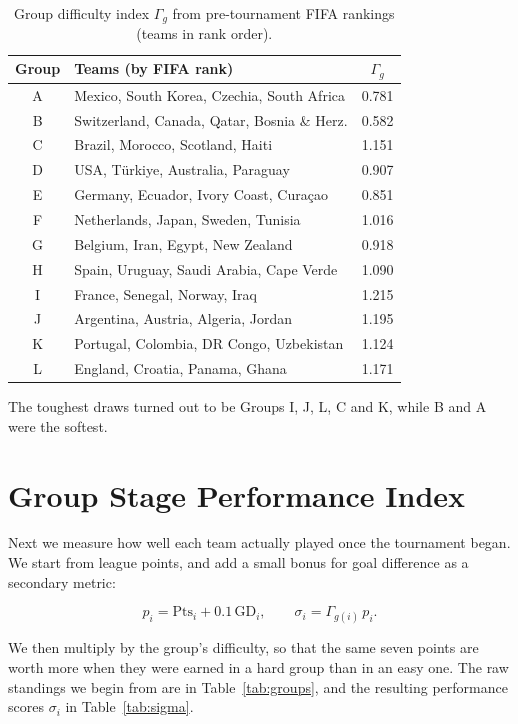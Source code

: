 \documentclass[11pt]{article}
\newcommand{\str}{\sigma}            %
\newcommand{\gdiff}{\Gamma}          %
\begin{document}
\begin{table}[htbp]
\centering
\caption{Group difficulty index $\gdiff_g$ from pre-tournament FIFA rankings (teams in rank order).}
\label{tab:gamma}
\begin{tabular}{@{}clc@{}}
\toprule
Group & Teams (by FIFA rank) & $\gdiff_g$ \\
\midrule
A & Mexico, South Korea, Czechia, South Africa & 0.781 \\
B & Switzerland, Canada, Qatar, Bosnia \& Herz. & 0.582 \\
C & Brazil, Morocco, Scotland, Haiti & 1.151 \\
D & USA, T\"urkiye, Australia, Paraguay & 0.907 \\
E & Germany, Ecuador, Ivory Coast, Cura\c{c}ao & 0.851 \\
F & Netherlands, Japan, Sweden, Tunisia & 1.016 \\
G & Belgium, Iran, Egypt, New Zealand & 0.918 \\
H & Spain, Uruguay, Saudi Arabia, Cape Verde & 1.090 \\
I & France, Senegal, Norway, Iraq & 1.215 \\
J & Argentina, Austria, Algeria, Jordan & 1.195 \\
K & Portugal, Colombia, DR Congo, Uzbekistan & 1.124 \\
L & England, Croatia, Panama, Ghana & 1.171 \\
\bottomrule
\end{tabular}
\end{table}

The toughest draws turned out to be Groups I, J, L, C and K, while B and A were the softest.

\FloatBarrier
\section{Group Stage Performance Index}
\label{sec:perf}

Next we measure how well each team actually played once the tournament began. We start from league points, and add a small bonus for goal difference as a secondary metric:

\begin{equation}
p_i = \mathrm{Pts}_i + 0.1\,\mathrm{GD}_i, \qquad \str_i = \gdiff_{g(i)}\, p_i .
\label{eq:perfindex}
\end{equation}

We then multiply by the group's difficulty, so that the same seven points are worth more when they were earned in a hard group than in an easy one. The raw standings we begin from are in Table~\ref{tab:groups}, and the resulting performance scores $\str_i$ in Table~\ref{tab:sigma}.
\end{document}
